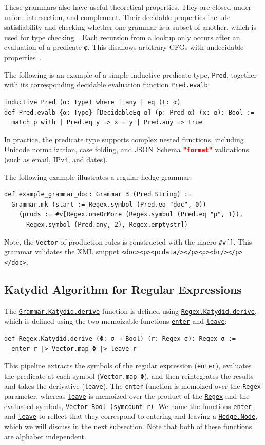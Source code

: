 \documentclass[acmsmall,%
  screen,%
  authorversion, %
  nonacm%
]{acmart}
\newcommand{\link}[2]{\mbox{\hyperref[#2]{\lstinline{#1}}}\xspace}
\newcommand{\Node}{\link{Hedge.Node}{Hedge}}
\newcommand{\GrammarKatydidDerive}{\link{Grammar.Katydid.derive}{def Grammar.Katydid.derive}}
\newcommand{\Regex}{\link{Regex}{Regex}}
\newcommand{\RegexKatydidDerive}{\link{Regex.Katydid.derive}{def Regex.Katydid.derive}}
\newcommand{\enter}{\link{enter}{def enter}}
\newcommand{\leave}{\link{leave}{def leave}}
\newcommand{\JSONSchema}{%
  JSON~Schema\xspace%
}
\newcommand{\format}{%
  \lstinline[language=json]|"format"|\xspace%
}
\newcommand{\CFGs}{\acp{CFG}\xspace}
\newcommand{\XML}{\ac{XML}\xspace}
\begin{document}
These grammars also have useful theoretical properties.
They are closed under union, intersection, and complement. 
Their decidable properties include satisfiability and checking whether one grammar is a subset of another, which is used for type checking~\cite{hosoya2003xduce}.
Each recursion from a lookup only occurs after an evaluation of a predicate \lstinline{φ}.
This disallows arbitrary \CFGs with undecidable properties~\cite{hosoya2003xduce}.

The following is an example of a simple inductive predicate type, \lstinline{Pred}, together with its corresponding decidable evaluation function \lstinline{Pred.evalb}:
\begin{lstlisting}[label=AnyEqPred]
inductive Pred (α: Type) where | any | eq (t: α)
def Pred.evalb {α: Type} [DecidableEq α] (p: Pred α) (x: α): Bool :=
  match p with | Pred.eq y => x = y | Pred.any => true
\end{lstlisting}
In practice, the predicate type supports complex nested functions, including Unicode normalization, case folding, and \JSONSchema \format validations (such as email, IPv4, and dates).


The following example illustrates a regular hedge grammar:
\begin{lstlisting}[label=def example_grammar_doc]
def example_grammar_doc: Grammar 3 (Pred String) :=
  Grammar.mk (start := Regex.symbol (Pred.eq "doc", 0))
    (prods := #v[Regex.oneOrMore (Regex.symbol (Pred.eq "p", 1)),
      Regex.symbol (Pred.any, 2), Regex.emptystr])
\end{lstlisting}
Note, the \lstinline{Vector} of production rules is constructed with the macro \lstinline{#v[]}.
This grammar validates the \XML snippet \lstinline{<doc><p><pcdata/></p><p><br/></p></doc>}.

\subsection{Katydid Algorithm for Regular Expressions}
\label{section_enter_and_leave}

The \GrammarKatydidDerive function is defined using \RegexKatydidDerive, which is defined using the two memoizable functions \enter and \leave:
\begin{lstlisting}[label=def Regex.Katydid.derive]
def Regex.Katydid.derive (Φ: σ → Bool) (r: Regex σ): Regex σ :=
  enter r |> Vector.map Φ |> leave r
\end{lstlisting}
This pipeline extracts the symbols of the regular expression (\enter), evaluates the predicate at each symbol (\lstinline{Vector.map Φ}), and then reintegrates the results and takes the derivative (\leave).
The \enter function is memoized over the \Regex parameter, whereas \leave is memoized over the product of the \Regex and the evaluated symbols, \lstinline{Vector Bool (symcount r)}.
We name the functions \enter and \leave to reflect that they correspond to entering and leaving a \Node, which we will discuss in the next subsection.
Note that both of these functions are alphabet independent.
\end{document}

